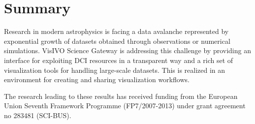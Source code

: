 \documentclass[11pt,twoside]{article}
\begin{document}
\section{Summary}
Research in modern astrophysics is facing a data avalanche represented by exponential growth of datasets obtained through observations or numerical simulations. VisIVO Science Gateway is addressing this challenge by providing an interface for exploiting DCI resources in a transparent way and a rich set of visualization tools for handling large-scale datasets. This is realized in an environment for creating and sharing visualization workflows.  

\acknowledgements The research leading to these results has received funding from the European Union Seventh Framework Programme (FP7/2007-2013) under grant agreement no 283481 (SCI-BUS).


\end{document}
